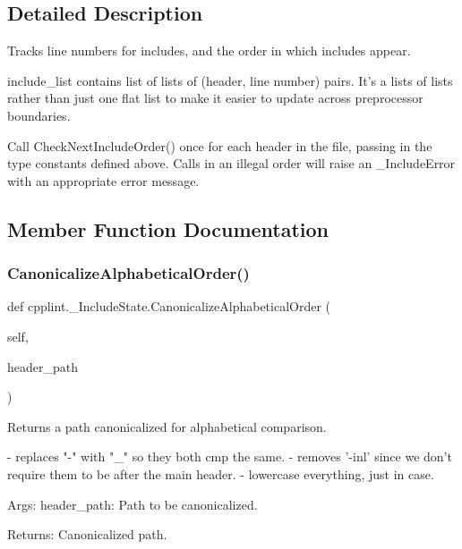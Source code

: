 \subsection{Detailed Description}
\begin{DoxyVerb}Tracks line numbers for includes, and the order in which includes appear.

include_list contains list of lists of (header, line number) pairs.
It's a lists of lists rather than just one flat list to make it
easier to update across preprocessor boundaries.

Call CheckNextIncludeOrder() once for each header in the file, passing
in the type constants defined above. Calls in an illegal order will
raise an _IncludeError with an appropriate error message.\end{DoxyVerb}
 

\subsection{Member Function Documentation}
\mbox{\label{classcpplint_1_1__IncludeState_ae69c652befa2d160194c0a02ff0c7d48}} 
\subsubsection{\texorpdfstring{Canonicalize\+Alphabetical\+Order()}{CanonicalizeAlphabeticalOrder()}}
{\footnotesize\ttfamily def cpplint.\+\_\+\+Include\+State.\+Canonicalize\+Alphabetical\+Order (\begin{DoxyParamCaption}\item[{}]{self,  }\item[{}]{header\+\_\+path }\end{DoxyParamCaption})}

\begin{DoxyVerb}Returns a path canonicalized for alphabetical comparison.

- replaces "-" with "_" so they both cmp the same.
- removes '-inl' since we don't require them to be after the main header.
- lowercase everything, just in case.

Args:
  header_path: Path to be canonicalized.

Returns:
  Canonicalized path.
\end{DoxyVerb}
 \mbox{\label{classcpplint_1_1__IncludeState_a80f82f17565e8412e7e5bbe52b464f18}} 
